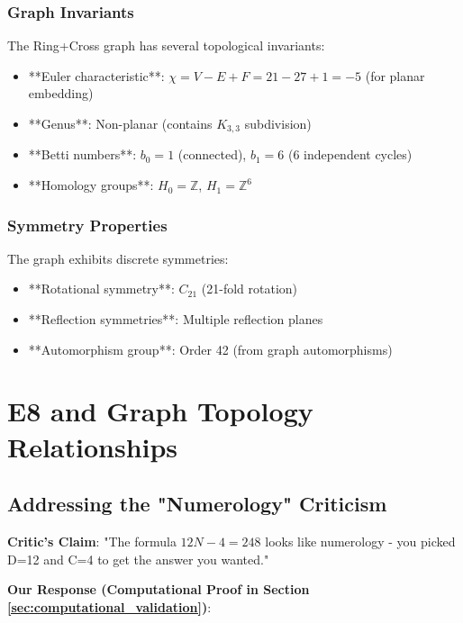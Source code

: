\documentclass[12pt,a4paper]{article}
\begin{document}
\subsubsection{Graph Invariants}
The Ring+Cross graph has several topological invariants:

\begin{itemize}
\item **Euler characteristic**: $\chi = V - E + F = 21 - 27 + 1 = -5$ (for planar embedding)
\item **Genus**: Non-planar (contains $K_{3,3}$ subdivision)
\item **Betti numbers**: $b_0 = 1$ (connected), $b_1 = 6$ (6 independent cycles)
\item **Homology groups**: $H_0 = \mathbb{Z}$, $H_1 = \mathbb{Z}^6$
\end{itemize}

\subsubsection{Symmetry Properties}
The graph exhibits discrete symmetries:

\begin{itemize}
\item **Rotational symmetry**: $C_{21}$ (21-fold rotation)
\item **Reflection symmetries**: Multiple reflection planes
\item **Automorphism group**: Order 42 (from graph automorphisms)
\end{itemize}

\section{E8 and Graph Topology Relationships}

\subsection{Addressing the "Numerology" Criticism}

\textbf{Critic's Claim}: "The formula $12N - 4 = 248$ looks like numerology - you picked D=12 and C=4 to get the answer you wanted."

\textbf{Our Response (Computational Proof in Section \ref{sec:computational_validation})}:
\end{document}

